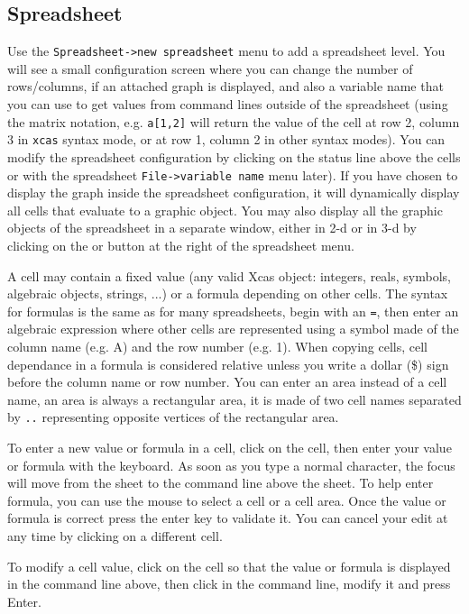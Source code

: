 \documentclass{article}
\begin{document}
\subsection{Spreadsheet}
Use the \verb|Spreadsheet->new spreadsheet| menu to add a spreadsheet level.
You will see a small configuration screen where you can change
the number of rows/columns, if an attached graph is displayed,
and also a variable name that you can use to get values
from command lines outside of the spreadsheet (using the matrix notation,
e.g. {\tt a[1,2]} will return the value of the cell at row 2, column 3
in {\tt xcas} syntax mode, or at row 1, column 2 in other syntax modes). 
You can modify the spreadsheet configuration by clicking on the
status line above the cells or with the 
spreadsheet \verb|File->variable name| menu later).
If you have chosen to display the graph inside the spreadsheet
configuration, it will dynamically
display all cells that evaluate to a graphic object. 
You may also display all the graphic
objects of the spreadsheet in a separate window, either in 2-d or in 3-d by 
clicking on the  or  button at the right of 
the spreadsheet menu.

A cell may contain
a fixed value (any valid Xcas object: integers, reals, symbols,
algebraic objects, strings, ...) or a formula depending on other
cells. The syntax for formulas is the same as for many spreadsheets, 
begin with an \verb|=|, then enter an algebraic expression where
other cells are represented using a symbol made of the column
name (e.g. A) and the row number (e.g. 1). When copying cells,
cell dependance in a formula is considered relative
unless you write a dollar (\$) sign before the column name or
row number. You can enter an area instead of a cell name, an area
is always a rectangular area, it is made of two cell names separated
by \verb|..| representing opposite vertices of the rectangular area.

To enter a new value or formula in a cell, click on the cell, then
enter your value or formula with the keyboard. As soon as you type
a normal character, the focus will move from the sheet to the
command line above the sheet. To help enter formula, you can use the mouse 
to select a cell or a cell area. Once the value or formula is correct
press the enter key to validate it. You can cancel your edit at
any time by clicking on a different cell.

To modify a cell value, click on the cell so that the value or formula
is displayed in the command line above, then click in the command line,
modify it and press Enter.
\end{document}
